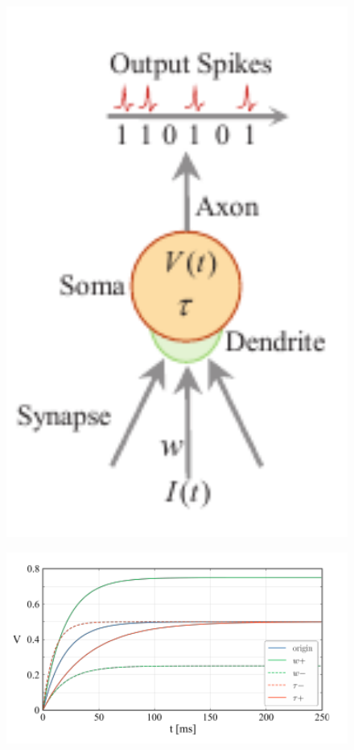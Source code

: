 \begin{figure}[htbp]
    \centering

    \parbox{1.0\textwidth}{
        \centering

        \begin{minipage}{0.243\textwidth}
            \includegraphics[width=1.0\textwidth]{Static/chap1_paramsnn_neuronmodel.pdf}
            \label{fig:lif}
        \end{minipage}
        \hspace{0.02\textwidth}
        \begin{minipage}{0.657\textwidth}
            \includegraphics[width=1.0\textwidth]{Static/chap1_paramsnn_volttrj.pdf}

\end{minipage}}
\end{figure}
